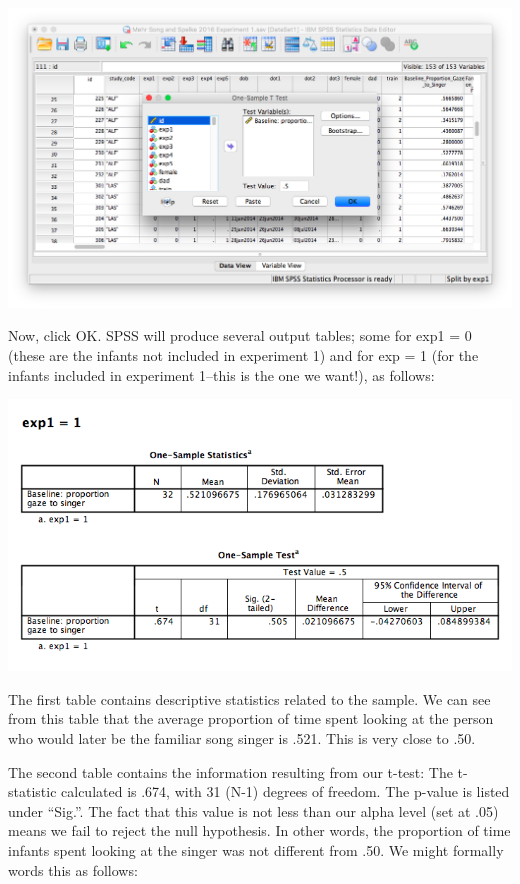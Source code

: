 \documentclass[
]{book}
\begin{document}
\includegraphics{img/6.4.15.png}

Now, click {OK}. SPSS will produce several output tables; some for exp1 = 0 (these are the infants not included in experiment 1) and for exp = 1 (for the infants included in experiment 1--this is the one we want!), as follows:

\includegraphics{img/6.4.16.png}

The first table contains descriptive statistics related to the sample. We can see from this table that the average proportion of time spent looking at the person who would later be the familiar song singer is .521. This is very close to .50.

The second table contains the information resulting from our t-test: The t-statistic calculated is .674, with 31 (N-1) degrees of freedom. The p-value is listed under ``Sig.''. The fact that this value is not less than our alpha level (set at .05) means we fail to reject the null hypothesis. In other words, the proportion of time infants spent looking at the singer was not different from .50. We might formally words this as follows:
\end{document}
